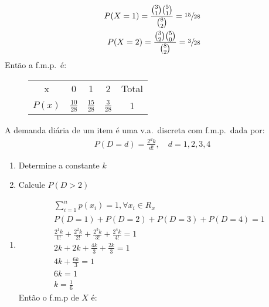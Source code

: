 \begin{description}
\begin{example}
\begin{obs}
       \end{obs}
       \begin{align*}
         P(X=1) = \displaystyle{ \frac{ \binom{3}{1} \binom{5}{1} }{ \binom{8}{2}}}= \sfrac{15}{28} \\
         P(X=2) = \displaystyle{\frac{ \binom{3}{2} \binom{5}{0} }{ \binom{8}{2}}}=\sfrac{ 3}{28} 
         \end{align*}
         Então a f.m.p.\ é:
         \begin{figure}[H]
           \centering
           \begin{tabular}{ c c c c c}
             \toprule
             x &0&1&2&Total \\ \cmidrule{2-4}
             $P(x)$&$\frac{10}{28}$&$\frac{15}{28}$&$ \frac{3}{28}$&1\\    \bottomrule
           \end{tabular}
         \end{figure}
       \end{example}
       \begin{example}
         A demanda diária de um item é uma v.a.\ discreta com f.m.p.\ dada por: 
         \begin{align*}
           P(D=d)=\frac{2^d k}{d!},\quad d=1,2,3,4
         \end{align*}
         \begin{enumerate}[label=(\alph*)]
           \item Determine a constante $k$
           \item Calcule $P(D>2)$
         \end{enumerate}
         \begin{enumerate}[label=(\alph*)]
           \item 
             \begin{align*}
               \sum \limits^{n}_{i=1} p(x_i)=1, \forall x_i \in R_{x}\\
               P(D=1)+P(D=2)+P(D=3)+P(D=4)=1\\
               \frac{2^1 k}{1!}+\frac{2^2 k}{2!}+\frac{2^3 k}{3!}+\frac{2^4 k}{4!}=1\\
               2k + 2k+ \frac{4k}{3}+\frac{2k}{3}=1 \\
               4k+\frac{6k}{3}=1 \\
               6k=1\\
               k=\frac{1}{6}
             \end{align*}
             Então o f.m.p de $X$ é: 
             \begin{align*}

\end{align*}
\end{enumerate}
\end{example}
\end{description}
